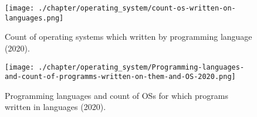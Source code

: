 \begin{figure*}[h!]
	\texttt{[image: ./chapter/operating\_system/count-os-written-on-languages.png]}
	\caption{Count of operating systems which written by programming language (2020).}
	\label{fig:count-os-written-on-languages}
\end{figure*}


\begin{figure*}[h!]
	\texttt{[image: ./chapter/operating\_system/Programming-languages-and-count-of-programms-written-on-them-and-OS-2020.png]}
	\caption{Programming languages and count of OSs for which programs written in languages (2020).}
	\label{fig:count-software-written-on-languages}
\end{figure*}